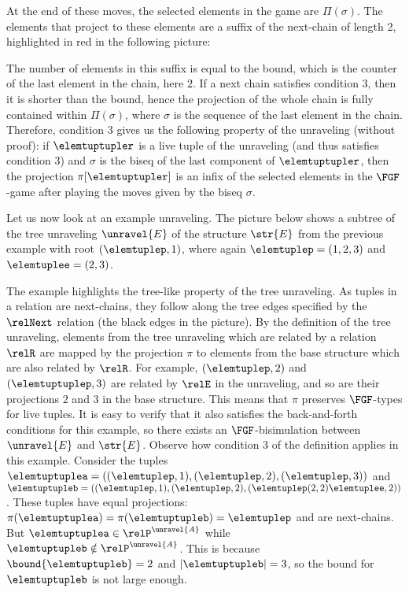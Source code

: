 At the end of these moves, the selected elements in the game are $\Pi(\sigma)$.
The elements that project to these elements are a suffix of the next-chain of length 2, highlighted in red in the following picture:
\begin{figure}[H]
  \centering
  
\end{figure}
The number of elements in this suffix is equal to the bound, which is the counter of the last element in the chain, here $2$.
If a next chain satisfies condition 3, then it is shorter than the bound, hence the projection of the whole chain is fully contained within $\Pi(\sigma)$, where $\sigma$ is the sequence of the last element in the chain.
Therefore, condition 3 gives us the following property of the unraveling (without proof): if $\elemtuptupler$ is a live tuple of the unraveling (and thus satisfies condition 3) and $\sigma$ is the biseq of the last component of $\elemtuptupler$, then the projection $\pi[\elemtuptupler]$ is an infix of the selected elements in the $\FGF$-game after playing the moves given by the biseq $\sigma$.

Let us now look at an example unraveling.
The picture below shows a subtree of the tree unraveling $\unravel{E}$ of the structure $\str{E}$ from the previous example with root $(\elemtuplep, 1)$, where again $\elemtuplep = (1,2,3)$ and $\elemtuplee = (2,3)$.
\begin{figure}[H]
  \centering
  
\end{figure}

\noindent
The example highlights the tree-like property of the tree unraveling.
As tuples in a relation are next-chains, they follow along the tree edges specified by the $\relNext$ relation (the black edges in the picture).
By the definition of the tree unraveling, elements from the tree unraveling which are related by a relation $\relR$ are mapped by the projection $\pi$ to elements from the base structure which are also related by $\relR$.
For example, $(\elemtuplep, 2)$ and $(\elemtuptuplep, 3)$ are related by $\relE$ in the unraveling, and so are their projections $2$ and $3$ in the base structure.
This means that $\pi$ preserves $\FGF$-types for live tuples.
It is easy to verify that it also satisfies the back-and-forth conditions for this example, so there exists an $\FGF$-bisimulation between $\unravel{E}$ and $\str{E}$.
Observe how condition 3 of the definition applies in this example.
Consider the tuples $\elemtuptuplea = ((\elemtuplep, 1), (\elemtuplep, 2), (\elemtuplep, 3))$ and $\elemtuptupleb = ((\elemtuplep, 1), (\elemtuplep, 2), (\elemtuplep(2,2)\elemtuplee, 2))$.
These tuples have equal projections: $\pi(\elemtuptuplea) = \pi(\elemtuptupleb) = \elemtuplep$ and are next-chains.
But $\elemtuptuplea \in \relP^{\unravel{A}}$ while $\elemtuptupleb \notin \relP^{\unravel{A}}$.
This is because $\bound{\elemtuptupleb} = 2$ and $|\elemtuptupleb| = 3$, so the bound for $\elemtuptupleb$ is not large enough.

